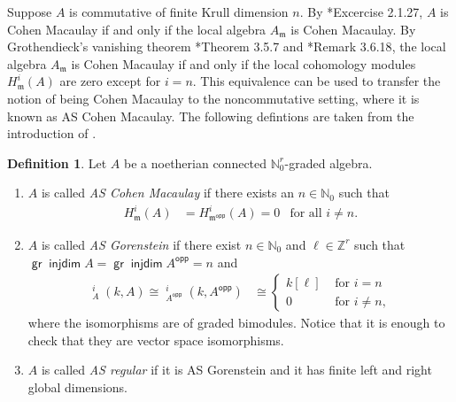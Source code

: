 \documentclass[11pt,fleqn]{article}
\theoremstyle{plain}
\theoremstyle{remark}
\theoremstyle{definition}
\newtheorem{Definition}[Theorem]{Definition}
\newcommand\NN{\mathbb N}
\newcommand\ZZ{\mathbb Z}
\newcommand\m{\mathfrak m}
\newcommand\opp{\mathsf{opp}}
\DeclareMathOperator\GrExt{\underline{\mathsf{Ext}}}
\DeclareMathOperator\gr{\mathsf{gr}}
\DeclareMathOperator\injdim{\mathsf{injdim}}
\begin{document}
Suppose $A$ is commutative of finite Krull dimension $n$. By \cite{BH}*{Excercise 2.1.27},
$A$ is Cohen Macaulay if and only if the  local algebra $A_\m$ is Cohen Macaulay. By 
Grothendieck's vanishing theorem \cite{BH}*{Theorem 3.5.7} and \cite{BH}*{Remark 3.6.18},
the local algebra $A_\m$ is Cohen Macaulay if and only if the local cohomology modules
$H^i_\m (A)$ are zero except for $i = n$. This equivalence can be used to transfer the
notion of being Cohen Macaulay to the  noncommutative setting, where it is known as AS
Cohen Macaulay. The following defintions are taken from the introduction of \cite{JZ}.
\begin{Definition} 
\label{as-regularity}
Let $A$ be a noetherian connected $\NN_0^r$-graded algebra.
\begin{enumerate}
  \item $A$ is called \emph{AS Cohen Macaulay} if there exists an $n \in \NN_0$ such that
  \begin{align*}
    H^i_{\m}(A) &= H_{\m^\opp}^i(A) = 0 &\mbox{for all } i \neq n.
  \end{align*}
	
  \item $A$ is called \emph{AS Gorenstein} if there exist $n \in \NN_0$ and $\ell \in
  \ZZ^r$ such that $\gr \injdim A= \gr \injdim A^\opp = n$ and
  \begin{align*}
    \GrExt_{A}^i(k,A) \cong \GrExt_{A^\opp}^i(k,A^\opp) 
      &\cong \begin{cases} k[\ell] & \mbox{ for } i = n \\ 0 & \mbox{ for } i
		\neq n,\end{cases}
  \end{align*}
  where the isomorphisms are of graded bimodules. Notice that it is enough to check that
  they are vector space isomorphisms.

  \item $A$ is called \emph{AS regular} if it is AS Gorenstein and it has finite left and
  right global dimensions.
\end{enumerate}
\end{Definition}
\end{document}
